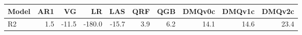\begin{tabular}{lrrrrrrrrr}
\toprule
Model & AR1 & VG & LR & LAS & QRF & QGB & DMQv0c & DMQv1c & DMQv2c \\
\midrule
R2 & 1.5 & -11.5 & -180.0 & -15.7 & 3.9 & 6.2 & 14.1 & 14.6 & 23.4 \\
\bottomrule
\end{tabular}
